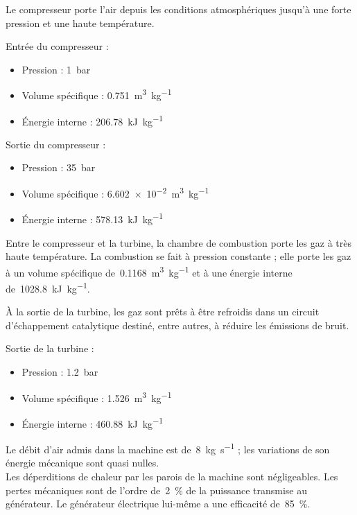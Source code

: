	Le compresseur porte l’air depuis les conditions atmosphériques jusqu’à une forte pression et une haute température.
	
	Entrée du compresseur :		
	\begin{itemize}
		\item Pression : 				\tab \SI{1}{\bar}
		\item Volume spécifique : 	\tab \SI{0,751}{\metre\cubed\per\kilogram}
		\item Énergie interne : 	\tab \SI{206,78}{\kilo\joule\per\kilogram}
	\end{itemize}

	Sortie du compresseur :		
	\begin{itemize}
		\item Pression : 				\tab \SI{35}{\bar}
		\item Volume spécifique : 	\tab \SI{6,602e-2}{\metre\cubed\per\kilogram}
		\item Énergie interne : 	\tab \SI{578,13}{\kilo\joule\per\kilogram}
	\end{itemize}

	Entre le compresseur et la turbine, la chambre de combustion porte les gaz à très haute température. La combustion se fait à pression constante ; elle porte les gaz à un volume spécifique de~\SI{0,1168}{\metre\cubed\per\kilogram} et à une énergie interne de~\SI{1028,8}{\kilo\joule\per\kilogram}.
	
	À la sortie de la turbine, les gaz sont prêts à être refroidis dans un circuit d’échappement catalytique destiné, entre autres, à réduire les émissions de bruit.
	
	Sortie de la turbine :		
	\begin{itemize}
		\item Pression : 				\tab \SI{1,2}{\bar}
		\item Volume spécifique : 	\tab \SI{1,526}{\metre\cubed\per\kilogram}
		\item Énergie interne : 	\tab \SI{460,88}{\kilo\joule\per\kilogram}
	\end{itemize}

	Le débit d’air admis dans la machine est de~\SI{8}{\kilogram\per\second} ; les variations de son énergie mécanique sont quasi nulles.\\
	Les déperditions de chaleur par les parois de la machine sont négligeables. Les pertes mécaniques sont de l’ordre de~\SI{2}{\percent} de la puissance transmise au générateur. Le générateur électrique lui-même a une efficacité de~\SI{85}{\percent}.

